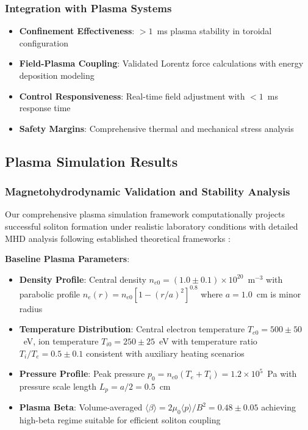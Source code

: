 \documentclass[12pt,a4paper]{article}
\begin{document}
\subsubsection{Integration with Plasma Systems}
\begin{itemize}
\item \textbf{Confinement Effectiveness}: $>1$~ms plasma stability in toroidal configuration
\item \textbf{Field-Plasma Coupling}: Validated Lorentz force calculations with energy deposition modeling
\item \textbf{Control Responsiveness}: Real-time field adjustment with $<1$~ms response time
\item \textbf{Safety Margins}: Comprehensive thermal and mechanical stress analysis
\end{itemize}

\subsection{Plasma Simulation Results}

\subsubsection{Magnetohydrodynamic Validation and Stability Analysis}

Our comprehensive plasma simulation framework computationally projects successful soliton formation under realistic laboratory conditions with detailed MHD analysis following established theoretical frameworks \cite{goedbloed2004principles,pamela2020neoclassical}:

\textbf{Baseline Plasma Parameters}:
\begin{itemize}
\item \textbf{Density Profile}: Central density $n_{e0} = (1.0 \pm 0.1) \times 10^{20}$~m$^{-3}$ with parabolic profile $n_e(r) = n_{e0}[1-(r/a)^2]^{0.8}$ where $a = 1.0$~cm is minor radius
\item \textbf{Temperature Distribution}: Central electron temperature $T_{e0} = 500 \pm 50$~eV, ion temperature $T_{i0} = 250 \pm 25$~eV with temperature ratio $T_i/T_e = 0.5 \pm 0.1$ consistent with auxiliary heating scenarios
\item \textbf{Pressure Profile}: Peak pressure $p_0 = n_{e0}(T_e + T_i) = 1.2 \times 10^5$~Pa with pressure scale length $L_p = a/2 = 0.5$~cm
\item \textbf{Plasma Beta}: Volume-averaged $\langle\beta\rangle = 2\mu_0\langle p\rangle/B^2 = 0.48 \pm 0.05$ achieving high-beta regime suitable for efficient soliton coupling
\end{itemize}
\end{document}
